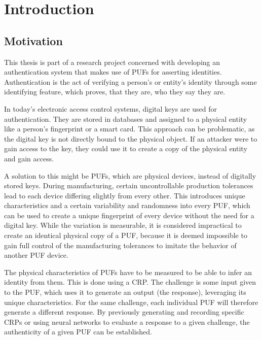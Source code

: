 \section{Introduction}
\label{sec:introduction}

\subsection{Motivation}
\label{sec:motivation}

This thesis is part of a research project concerned with developing an authentication system
that makes use of \acp{PUF} for asserting identities.
Authentication is the act of verifying a person's or entity's identity through some identifying
feature, which proves, that they are, who they say they are. \cite[][p. 398]{Basavala2012}

In today's electronic access control systems, digital keys are used for authentication.
They are stored in databases and assigned to a physical entity like a person's
fingerprint or a smart card.
This approach can be problematic, as the digital key is not directly bound to
the physical object. If an attacker were to gain access to the key,
they could use it to create a copy of the physical entity
and gain access. \cite[][p. 81]{Gao2020}

A solution to this might be \acp{PUF}, which are physical devices, instead of
digitally stored keys.
During manufacturing, certain uncontrollable production tolerances lead to
each device differing slightly from every other.
This introduces unique characteristics and a certain variability and randomness into every \ac{PUF},
which can be used to create a unique fingerprint of every device without the need for a digital key.
While the variation is measurable, it is considered impractical to create an identical physical copy of
a \ac{PUF}, because it is deemed impossible to gain full control of the
manufacturing tolerances to imitate the behavior of another \ac{PUF} device. \cite[][p. 81]{Gao2020}

The physical characteristics of \acp{PUF} have to be measured to be able to infer an identity from them.
This is done using a \ac{CRP}. The challenge is some input given to the \ac{PUF}, which uses it to generate an output (the response),
leveraging its unique characteristics. For the same challenge, each individual \ac{PUF} will therefore generate a different response.
By previously generating and recording specific \acp{CRP} or using neural networks to evaluate a response to a
given challenge, the authenticity of a given \ac{PUF} can be established. \cite[][p. 81]{Gao2020}

